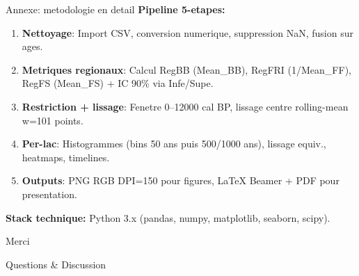 \documentclass[aspectratio=169,11pt]{beamer}
\begin{document}
\begin{frame}{Annexe: metodologie en detail}
\small
\textbf{Pipeline 5-etapes:}
\begin{enumerate}
  \item \textbf{Nettoyage}: Import CSV, conversion numerique, suppression NaN, fusion sur ages.
  
  \item \textbf{Metriques regionaux}: Calcul RegBB (Mean\_BB), RegFRI (1/Mean\_FF), RegFS (Mean\_FS) + IC 90\% via Infe/Supe.
  
  \item \textbf{Restriction + lissage}: Fenetre 0--12000 cal BP, lissage centre rolling-mean w=101 points.
  
  \item \textbf{Per-lac}: Histogrammes (bins 50 ans puis 500/1000 ans), lissage equiv., heatmaps, timelines.
  
  \item \textbf{Outputs}: PNG RGB DPI=150 pour figures, LaTeX Beamer + PDF pour presentation.
\end{enumerate}

\textbf{Stack technique:} Python 3.x (pandas, numpy, matplotlib, seaborn, scipy).
\end{frame}

\begin{frame}
\centering
\Huge \alert{Merci}
\vspace{0.5cm}

\Large
Questions \& Discussion
\end{frame}
\end{document}
